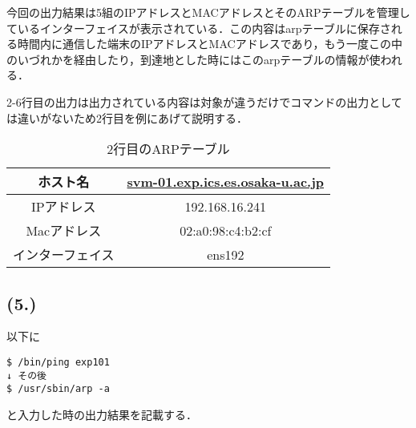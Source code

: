\documentclass[a4j]{jarticle}
\newenvironment{tab}{\begin{table}}{\end{table}} %
\newenvironment{tabu}{\begin{tabular}}{\end{tabular}} %
\begin{document}
今回の出力結果は5組のIPアドレスとMACアドレスとそのARPテーブルを管理しているインターフェイスが表示されている．この内容はarpテーブルに保存される時間内に通信した端末のIPアドレスとMACアドレスであり，もう一度この中のいづれかを経由したり，到達地とした時にはこのarpテーブルの情報が使われる．

2-6行目の出力は出力されている内容は対象が違うだけでコマンドの出力としては違いがないため2行目を例にあげて説明する．

\begin{tab}[H]
\centering
\begin{tabu}{|c|c|}
\hline
ホスト名 & \url{svm-01.exp.ics.es.osaka-u.ac.jp} \\
\hline
IPアドレス & 192.168.16.241 \\
\hline
Macアドレス & 02:a0:98:c4:b2:cf \\
\hline
インターフェイス & ens192 \\
\hline
\end{tabu}
\caption{2行目のARPテーブル}
\label{tab:arp}
\end{tab}

\subsection{(5.)}
\label{sec:5.}

以下に
\begin{verbatim}
$ /bin/ping exp101
↓ その後
$ /usr/sbin/arp -a
\end{verbatim}
と入力した時の出力結果を記載する．
\end{document}
